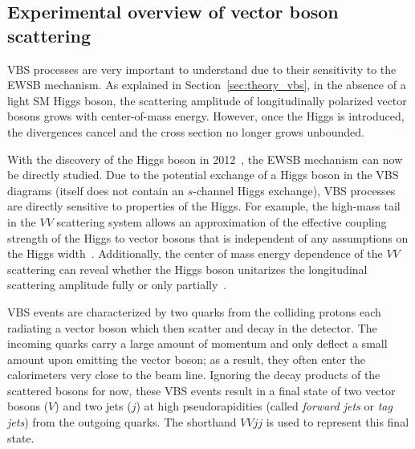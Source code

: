 \subsection{Experimental overview of vector boson scattering}\label{ssww13tev:vbs_theory}
VBS processes are very important to understand due to their sensitivity to the EWSB mechanism.
As explained in Section~\ref{sec:theory_vbs}, in the absence of a light SM Higgs boson, the scattering amplitude of longitudinally polarized vector bosons grows with center-of-mass energy. %
However, once the Higgs is introduced, the divergences cancel and the cross section no longer grows unbounded. %

With the discovery of the Higgs boson in 2012~\cite{HIGG-2012-27, CMS-HIG-12-028}, the EWSB mechanism can now be directly studied.
Due to the potential exchange of a Higgs boson in the VBS diagrams (\ssww itself does not contain an $s$-channel Higgs exchange), VBS processes are directly sensitive to properties of the Higgs.
For example, the high-mass tail in the $VV$ scattering system allows an approximation of the effective coupling strength of the Higgs to vector bosons that is independent of any assumptions on the Higgs width~\cite{2015.higgs-constraints-from-vbs}.
Additionally, the center of mass energy dependence of the $VV$ scattering can reveal whether the Higgs boson unitarizes the longitudinal scattering amplitude fully or only partially~\cite{2014.higgs-WW-scattering-theory}.

VBS events are characterized by two quarks from the colliding protons each radiating a vector boson which then scatter and decay in the detector.
The incoming quarks carry a large amount of momentum and only deflect a small amount upon emitting the vector boson; as a result, they often enter the calorimeters very close to the beam line.
Ignoring the decay products of the scattered bosons for now, these VBS events result in a final state of two vector bosons ($V$) and two jets ($j$) at high pseudorapidities (called \emph{forward jets} or \emph{tag jets}) from the outgoing quarks.
The shorthand $VVjj$ is used to represent this final state.

